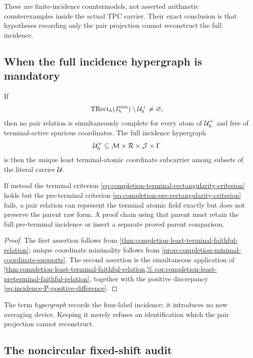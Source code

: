 These are finite-incidence countermodels, not asserted arithmetic
counterexamples inside the actual TPC carrier.  Their exact conclusion is
that hypotheses recording only the pair projection cannot reconstruct the
full incidence.

\subsection{When the full incidence hypergraph is mandatory}

\begin{theorem}
\label{thm:completion-hypergraph-necessity}
If
\begin{equation}
 \operatorname{TRect}_h(I_h^{\min})\setminus\mathcal U_h^+\ne\varnothing,
 \label{eq:completion-active-spurious-obstruction}
\end{equation}
then no pair relation is simultaneously complete for every atom of
\(\mathcal U_h^+\) and free of terminal-active spurious coordinates.  The full
incidence hypergraph
\[
 \mathcal U_h^+\subseteq\mathcal M\times\mathcal R\times\mathcal J\times\Gamma
\]
is then the unique least terminal-atomic coordinate subcarrier among
subsets of the literal carrier \(\mathcal U\).

If instead the terminal criterion
\eqref{eq:completion-terminal-rectangularity-criterion} holds but the
pre-terminal criterion
\eqref{eq:completion-pre-rectangularity-criterion} fails, a pair relation
can represent the terminal atomic field exactly but does not preserve the
parent raw form.  A proof chain using that parent must retain the full
pre-terminal incidence or insert a separate proved parent comparison.
\end{theorem}

\begin{proof}
The first assertion follows from
\cref{thm:completion-least-terminal-faithful-relation}; unique coordinate
minimality follows from
\cref{prop:completion-minimal-coordinate-supports}.  The second assertion
is the simultaneous application of
\cref{thm:completion-least-terminal-faithful-relation,%
cor:completion-least-preterminal-faithful-relation}, together with the
positive discrepancy \eqref{eq:incidence-P-positive-difference}.
\end{proof}

The term \emph{hypergraph} records the four-label incidence; it introduces
no new averaging device.  Keeping it merely refuses an identification
which the pair projection cannot reconstruct.

\subsection{The noncircular fixed-shift audit}

